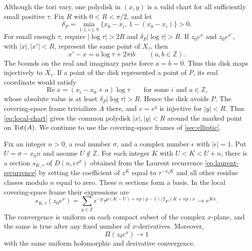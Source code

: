 Although the tori vary, one polydisk in $(x,y)$ is a valid chart for all sufficiently small positive $\tau$. Fix $R$ with $0<R<\pi/2$, and let
\[
 \delta_P=\min_{1\leq i\leq9}
           \{x_0-x_i,\,1-(x_0-x_i)\}>0.
\]
For small enough $\tau$, require $|\log\tau|>2R$ and $\delta_P|\log\tau|>R$. If $z_0e^x$ and $z_0e^{x'}$, with $|x|,|x'|<R$, represent the same point of $X_\tau$, then
\[
 x'-x=a\log\tau+2\pi\mathrm{i}b\qquad(a,b\in\mathbb{Z}).
\]
The bounds on the real and imaginary parts force $a=b=0$. Thus this disk maps injectively to $X_\tau$. If a point of the disk represented a point of $P$, its real coordinate would satisfy
\[
 \operatorname{Re}x=(x_i-x_0+a)\log\tau
 \qquad\text{for some }i\text{ and }a\in\mathbb{Z},
\]
whose absolute value is at least $\delta_P|\log\tau|>R$. Hence the disk avoids $P$. The covering-space frame trivializes $A$ there, and $v=e^y$ is injective for $|y|<R$. Thus \eqref{eq:local-chart} gives the common polydisk $|x|,|y|<R$ around the marked point on $\operatorname{Tot}(A)$. We continue to use the covering-space frames of \cref{sec:elliptic}.

\begin{lemma}
\label{lem:theta-limit}
Fix an integer $n>0$, a real number $\sigma$, and a complex number $\epsilon$ with $|\epsilon|=1$. Put $U=\sigma-x_0n$ and assume $U\notin\mathbb{Z}$. For each integer $K$ with $U<K<U+n$, there is a section $s_{K,\tau}$ of $D(n,\epsilon\tau^\sigma)$ obtained from the Laurent recurrence \eqref{eq:laurent-recurrence} by setting the coefficient of $z^K$ equal to $\tau^{-x_0K}$ and all other residue classes modulo $n$ equal to zero. These $n$ sections form a basis. In the local covering-space frame their expressions are
\begin{equation}
 s_{K,\tau}(z_0e^x)
  =\sum_{p\in\mathbb{Z}}\epsilon^{-p}
     \tau^{p(K-U)+np(p-1)/2}e^{(K+np)x}
  \longrightarrow e^{Kx}.
 \label{eq:normalized-theta}
\end{equation}
The convergence is uniform on each compact subset of the complex $x$-plane, and the same is true after any fixed number of $x$-derivatives. Moreover,
\[
 \Pi(z_0e^x)\longrightarrow1
\]
with the same uniform holomorphic and derivative convergence.
\end{lemma}

